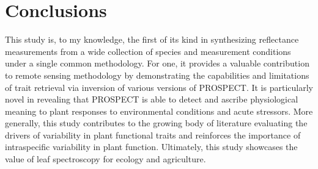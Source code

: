 \section{Conclusions}

This study is, to my knowledge, the first of its kind in synthesizing reflectance measurements from a wide collection of species and measurement conditions under a single common methodology.
For one, it provides a valuable contribution to remote sensing methodology by demonstrating the capabilities and limitations of trait retrieval via inversion of various versions of PROSPECT\@.
It is particularly novel in revealing that PROSPECT is able to detect and ascribe physiological meaning to plant responses to environmental conditions and acute stressors.
More generally, this study contributes to the growing body of literature evaluating the drivers of variability in plant functional traits and reinforces the importance of intraspecific variability in plant function.
Ultimately, this study showcases the value of leaf spectroscopy for ecology and agriculture.
